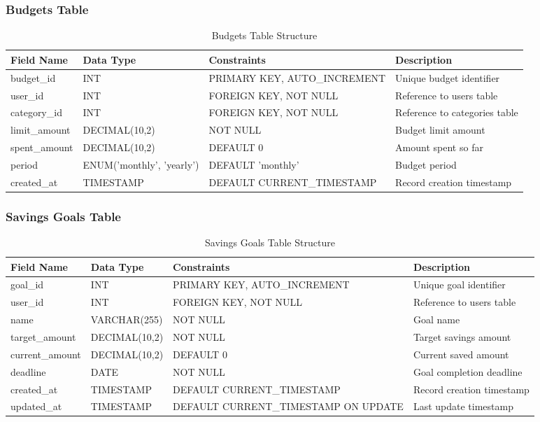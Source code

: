 \documentclass[12pt,a4paper]{article}
\begin{document}
\subsubsection{Budgets Table}
\begin{table}[H]
    \centering
    \caption{Budgets Table Structure}
    \label{tab:budgets_table}
    \begin{tabular}{@{}llll@{}}
        \toprule
        \textbf{Field Name} & \textbf{Data Type} & \textbf{Constraints} & \textbf{Description} \\
        \midrule
        budget\_id & INT & PRIMARY KEY, AUTO\_INCREMENT & Unique budget identifier \\
        user\_id & INT & FOREIGN KEY, NOT NULL & Reference to users table \\
        category\_id & INT & FOREIGN KEY, NOT NULL & Reference to categories table \\
        limit\_amount & DECIMAL(10,2) & NOT NULL & Budget limit amount \\
        spent\_amount & DECIMAL(10,2) & DEFAULT 0 & Amount spent so far \\
        period & ENUM('monthly', 'yearly') & DEFAULT 'monthly' & Budget period \\
        created\_at & TIMESTAMP & DEFAULT CURRENT\_TIMESTAMP & Record creation timestamp \\
        \bottomrule
    \end{tabular}
\end{table}

\subsubsection{Savings Goals Table}
\begin{table}[H]
    \centering
    \caption{Savings Goals Table Structure}
    \label{tab:savings_goals_table}
    \begin{tabular}{@{}llll@{}}
        \toprule
        \textbf{Field Name} & \textbf{Data Type} & \textbf{Constraints} & \textbf{Description} \\
        \midrule
        goal\_id & INT & PRIMARY KEY, AUTO\_INCREMENT & Unique goal identifier \\
        user\_id & INT & FOREIGN KEY, NOT NULL & Reference to users table \\
        name & VARCHAR(255) & NOT NULL & Goal name \\
        target\_amount & DECIMAL(10,2) & NOT NULL & Target savings amount \\
        current\_amount & DECIMAL(10,2) & DEFAULT 0 & Current saved amount \\
        deadline & DATE & NOT NULL & Goal completion deadline \\
        created\_at & TIMESTAMP & DEFAULT CURRENT\_TIMESTAMP & Record creation timestamp \\
        updated\_at & TIMESTAMP & DEFAULT CURRENT\_TIMESTAMP ON UPDATE & Last update timestamp \\
        \bottomrule
    \end{tabular}
\end{table}
\end{document}
